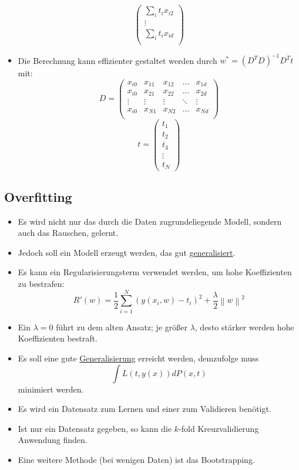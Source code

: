 \documentclass{scrartcl}
\newcommand{\norm}[1]{\left\lVert#1\right\rVert}
\begin{document}
\begin{itemize}
\[\begin{pmatrix}
		\sum_i t_i x_{i2} \\
		\vdots \\
		\sum_i t_i x_{id} \\
	\end{pmatrix} \]
	\item Die Berechnung kann effizienter gestaltet werden durch $ w^* = 
	(D^TD)^{-1} D^Tt $ mit:
	\[ D = \begin{pmatrix}
		x_{i0} & x_{11} & x_{12} & \ldots & x_{1d} \\
		x_{i0} & x_{21} & x_{22} & \ldots & x_{2d} \\
		\vdots & \vdots & \vdots & \ddots & \vdots \\
		x_{i0} & x_{N1} & x_{N2} & \ldots & x_{Nd} \\
	\end{pmatrix} \]
	\[ t = \begin{pmatrix}
		t_1 \\
		t_2 \\
		t_3 \\
		\vdots \\
		t_N
	\end{pmatrix} \]
\end{itemize}

\subsection{Overfitting}

\begin{itemize}
	\item Es wird nicht nur das durch die Daten zugrundeliegende Modell, 
	sondern auch das Rauschen, gelernt.
	\item Jedoch soll ein Modell erzeugt werden, das gut 
	\underline{generalisiert}.
	\item Es kann ein Regularisierungsterm verwendet werden, um hohe 
	Koeffizienten zu bestrafen:
	\[ R'(w) = \frac{1}{2} \sum_{i=1}^{N} (y(x_i,w) - t_i)^2 + 
	\frac{\lambda}{2} \norm{w}^2 \]
	\item Ein $ \lambda = 0 $ führt zu dem alten Ansatz; je größer $ \lambda $, 
	desto stärker werden hohe Koeffizienten bestraft.
	\item Es soll eine gute \underline{Generalisierung} erreicht werden, 
	demzufolge muss
	\[ \int L(t, y(x)) dP(x,t) \]
	minimiert werden.
	\item Es wird ein Datensatz zum Lernen und einer zum Validieren benötigt.
	\item Ist nur ein Datensatz gegeben, so kann die $ k $-fold 
	Kreuzvalidierung Anwendung finden.
	\item Eine weitere Methode (bei wenigen Daten) ist das Bootstrapping.
\end{itemize}
\end{document}
